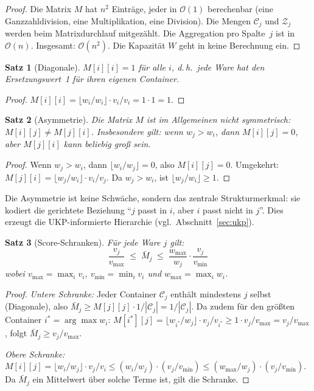 \documentclass[a4paper,11pt]{article}
\newtheorem{satz}{Satz}
\begin{document}
\begin{proof}
Die Matrix $M$ hat $n^2$ Einträge, jeder in $\mathcal{O}(1)$
berechenbar (eine Ganzzahldivision, eine Multiplikation,
eine Division). Die Mengen $\mathcal{C}_j$ und $\mathcal{Z}_j$
werden beim Matrixdurchlauf mitgezählt.
Die Aggregation pro Spalte~$j$ ist in $\mathcal{O}(n)$.
Insgesamt: $\mathcal{O}(n^2)$.
Die Kapazität $W$ geht in keine Berechnung ein.
\end{proof}

\begin{satz}[Diagonale]
\label{satz:diag}
$M[i][i] = 1$ für alle $i$, d.\,h.\ jede Ware hat den
Ersetzungswert~1 für ihren eigenen Container.
\end{satz}

\begin{proof}
$M[i][i] = \lfloor w_i/w_i \rfloor \cdot v_i/v_i = 1 \cdot 1 = 1$.
\end{proof}

\begin{satz}[Asymmetrie]
\label{satz:asym}
Die Matrix $M$ ist im Allgemeinen nicht symmetrisch:
$M[i][j] \ne M[j][i]$.
Insbesondere gilt: wenn $w_j > w_i$, dann $M[i][j] = 0$,
aber $M[j][i]$ kann beliebig groß sein.
\end{satz}

\begin{proof}
Wenn $w_j > w_i$, dann $\lfloor w_i/w_j \rfloor = 0$,
also $M[i][j] = 0$.
Umgekehrt: $M[j][i] = \lfloor w_j/w_i \rfloor \cdot v_i/v_j$.
Da $w_j > w_i$, ist $\lfloor w_j/w_i \rfloor \ge 1$.
\end{proof}

\noindent
Die Asymmetrie ist keine Schwäche, sondern das zentrale
Strukturmerkmal: sie kodiert die gerichtete Beziehung
``$j$ passt in $i$, aber $i$ passt nicht in $j$''.
Dies erzeugt die UKP-informierte Hierarchie
(vgl.\ Abschnitt~\ref{sec:ukp}).

\begin{satz}[Score-Schranken]
\label{satz:bounds}
Für jede Ware $j$ gilt:
\[
\frac{v_j}{v_{\max}} \;\le\; \bar{M}_j \;\le\;
\frac{w_{\max}}{w_j} \cdot \frac{v_j}{v_{\min}}
\]
wobei $v_{\max} = \max_i v_i$, $v_{\min} = \min_i v_i$
und $w_{\max} = \max_i w_i$.
\end{satz}

\begin{proof}
\emph{Untere Schranke:}
Jeder Container $\mathcal{C}_j$ enthält mindestens $j$ selbst
(Diagonale), also $\bar{M}_j \ge M[j][j] \cdot 1/|\mathcal{C}_j|
= 1/|\mathcal{C}_j|$. Da zudem für den größten Container
$i^* = \arg\max w_i$: $M[i^*][j] = \lfloor w_{i^*}/w_j \rfloor
\cdot v_j/v_{i^*} \ge 1 \cdot v_j/v_{\max} = v_j/v_{\max}$,
folgt $\bar{M}_j \ge v_j/v_{\max}$.

\emph{Obere Schranke:}
$M[i][j] = \lfloor w_i/w_j \rfloor \cdot v_j/v_i
\le (w_i/w_j) \cdot (v_j/v_{\min})
\le (w_{\max}/w_j) \cdot (v_j/v_{\min})$.
Da $\bar{M}_j$ ein Mittelwert über solche Terme ist,
gilt die Schranke.
\end{proof}
\end{document}
